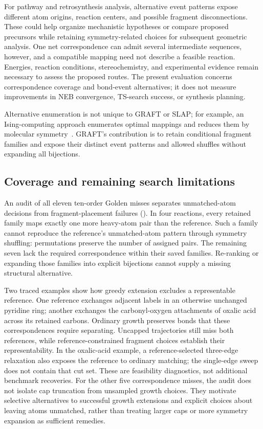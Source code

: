 For pathway and retrosynthesis analysis, alternative event patterns expose different atom origins, reaction centers, and possible fragment disconnections. These could help organize mechanistic hypotheses or compare proposed precursors while retaining symmetry-related choices for subsequent geometric analysis. One net correspondence can admit several intermediate sequences, however, and a compatible mapping need not describe a feasible reaction. Energies, reaction conditions, stereochemistry, and experimental evidence remain necessary to assess the proposed routes. The present evaluation concerns correspondence coverage and bond-event alternatives; it does not measure improvements in NEB convergence, TS-search success, or synthesis planning.

Alternative enumeration is not unique to GRAFT or SLAP; for example, an Ising-computing approach enumerates optimal mappings and reduces them by molecular symmetry~\citep{ali2025}. GRAFT's contribution is to retain conditional fragment families and expose their distinct event patterns and allowed shuffles without expanding all bijections.

\FloatBarrier
\subsection{Coverage and remaining search limitations}

An audit of all eleven ten-order Golden misses separates unmatched-atom decisions from fragment-placement failures (). In four reactions, every retained family maps exactly one more heavy-atom pair than the reference. Such a family cannot reproduce the reference's unmatched-atom pattern through symmetry shuffling: permutations preserve the number of assigned pairs. The remaining seven lack the required correspondence within their saved families. Re-ranking or expanding those families into explicit bijections cannot supply a missing structural alternative.

Two traced examples show how greedy extension excludes a representable reference. One reference exchanges adjacent labels in an otherwise unchanged pyridine ring; another exchanges the carbonyl-oxygen attachments of oxalic acid across its retained carbons. Ordinary growth preserves bonds that these correspondences require separating. Uncapped trajectories still miss both references, while reference-constrained fragment choices establish their representability. In the oxalic-acid example, a reference-selected three-edge relaxation also exposes the reference to ordinary matching; the single-edge sweep does not contain that cut set. These are feasibility diagnostics, not additional benchmark recoveries. For the other five correspondence misses, the audit does not isolate cap truncation from unsampled growth choices. They motivate selective alternatives to successful growth extensions and explicit choices about leaving atoms unmatched, rather than treating larger caps or more symmetry expansion as sufficient remedies.

